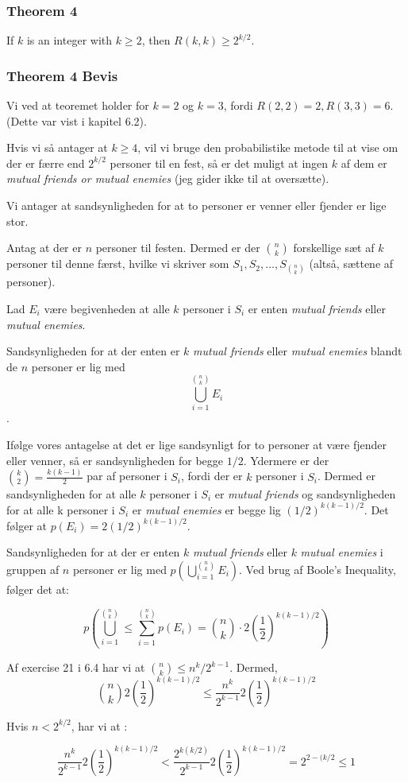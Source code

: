 \documentclass{beamer}
\begin{document}
\begin{frame}
  \frametitle{Theorem 4}
  \begin{theorem}
    If $k$ is an integer with $k \geq 2$, then $R(k,k) \geq 2^{k/2}.$
  \end{theorem}
\end{frame}

\begin{frame}[allowframebreaks]
  \frametitle{Theorem 4 Bevis}
  Vi ved at teoremet holder for $k = 2$ og $k = 3$, fordi $R(2,2) = 2, R(3,3) = 6$. (Dette var vist i kapitel 6.2).

  Hvis vi så antager at $k \geq 4$, vil vi bruge den probabilistike metode til at vise om der er færre end $2^{k/2}$ personer til en fest, så er det muligt at ingen $k$ af dem er \textit{mutual friends or mutual enemies} (jeg gider ikke til at oversætte).

  Vi antager at sandsynligheden for at to personer er venner eller fjender er lige stor.

  Antag at der er $n$ personer til festen. Dermed er der $\binom{n}{k}$ forskellige sæt af $k$ personer til denne færst, hvilke vi skriver som $S_{1}, S_{2}, \ldots, S_{\binom{n}{k}}$ (altså, sættene af personer).

  Lad $E_{i}$ være begivenheden at alle $k$  personer i $S_{i}$ er enten \textit{mutual friends} eller \textit{mutual enemies}.

  Sandsynligheden for at der enten er $k$ \textit{mutual friends} eller \textit{mutual enemies} blandt de $n$ personer er lig med \[ \bigcup\limits_{i=1}^{\binom{n}{k}}E_{i} \].

  Ifølge vores antagelse at det er lige sandsynligt for to personer at være fjender eller venner, så er sandsynligheden for begge $1/2$. Ydermere er der $\binom{k}{2} = \frac{k(k-1)}{2}$ par af personer i $S_{i}$, fordi der er $k$ personer i $S_{i}$. Dermed er sandsynligheden for at alle $k$ personer i $S_{i}$ er \textit{mutual friends} og sandsynligheden for at alle k personer i $S_{i}$ er \textit{mutual enemies} er begge lig $(1/2)^{k(k-1)/2}$. Det følger at $p(E_{i}) = 2(1/2)^{k(k-1)/2}$.

  Sandsynligheden for at der er enten $k$ \textit{mutual friends} eller $k$ \textit{mutual enemies} i gruppen af $n$ personer er lig med $p(\bigcup\limits_{i=1}^{\binom{n}{k}} E_{i})$. Ved brug af Boole's Inequality, følger det at:

  \[ p\left( \bigcup\limits_{i=1}^{\binom{n}{k}} \leq \sum_{i=1}^{\binom{n}{k}} p(E_{i}) = \binom{n}{k} \cdot 2 \left( \frac{1}{2} \right)^{k(k-1)/2}   \right) \]

  Af exercise 21 i 6.4 har vi at $\binom{n}{k} \leq n^{k}/2^{k-1}$. Dermed,
  \[ \binom{n}{k} 2 \left( \frac{1}{2} \right)^{k(k-1)/2} \leq \frac{n^{k}}{2^{k-1}}2 \left( \frac{1}{2} \right)^{k(k-1)/2} \]

  Hvis $n < 2^{k/2}$, har vi at :

  \[ \frac{n^{k}}{2^{k-1}}2 \left( \frac{1}{2} \right)^{k(k-1)/2} < \frac{2^{k(k/2)}}{2^{k-1}}2 \left( \frac{1}{2} \right)^{k(k-1)/2} = 2^{2-(k/2} \leq 1 \]
\end{frame}
\end{document}
